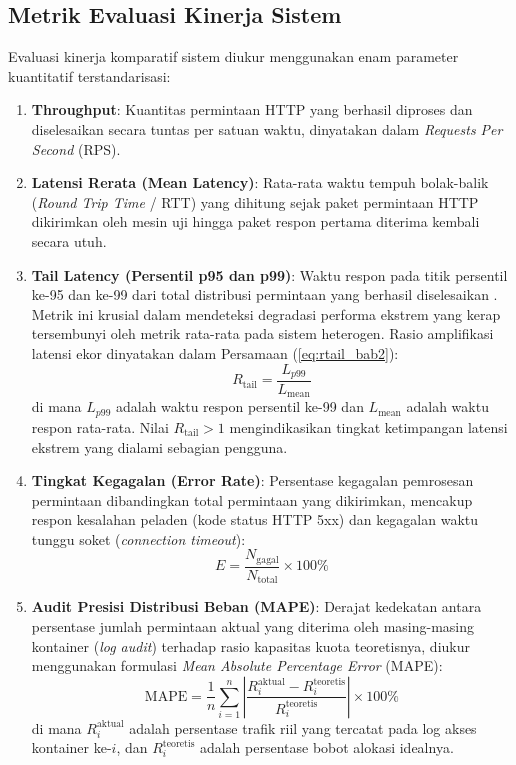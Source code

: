 \subsection{Metrik Evaluasi Kinerja Sistem}
Evaluasi kinerja komparatif sistem diukur menggunakan enam parameter kuantitatif terstandarisasi:
\begin{enumerate}
    \item \textbf{Throughput}: Kuantitas permintaan HTTP yang berhasil diproses dan diselesaikan secara tuntas per satuan waktu, dinyatakan dalam \textit{Requests Per Second} (RPS).
    \item \textbf{Latensi Rerata (Mean Latency)}: Rata-rata waktu tempuh bolak-balik (\textit{Round Trip Time} / RTT) yang dihitung sejak paket permintaan HTTP dikirimkan oleh mesin uji hingga paket respon pertama diterima kembali secara utuh.
    \item \textbf{Tail Latency (Persentil p95 dan p99)}: Waktu respon pada titik persentil ke-95 dan ke-99 dari total distribusi permintaan yang berhasil diselesaikan \citep{wodislawski2026ponytail, li2025tailbench}. Metrik ini krusial dalam mendeteksi degradasi performa ekstrem yang kerap tersembunyi oleh metrik rata-rata pada sistem heterogen. Rasio amplifikasi latensi ekor dinyatakan dalam Persamaan (\ref{eq:rtail_bab2}):
    \begin{equation}
        R_{\text{tail}} = \frac{L_{p99}}{L_{\text{mean}}}
        \label{eq:rtail_bab2}
    \end{equation}
    di mana $L_{p99}$ adalah waktu respon persentil ke-99 dan $L_{\text{mean}}$ adalah waktu respon rata-rata. Nilai $R_{\text{tail}} > 1$ mengindikasikan tingkat ketimpangan latensi ekstrem yang dialami sebagian pengguna.
    \item \textbf{Tingkat Kegagalan (Error Rate)}: Persentase kegagalan pemrosesan permintaan dibandingkan total permintaan yang dikirimkan, mencakup respon kesalahan peladen (kode status HTTP 5xx) dan kegagalan waktu tunggu soket (\textit{connection timeout}):
    \begin{equation}
        E = \frac{N_{\text{gagal}}}{N_{\text{total}}} \times 100\%
        \label{eq:error_rate_bab2}
    \end{equation}
    \item \textbf{Audit Presisi Distribusi Beban (MAPE)}: Derajat kedekatan antara persentase jumlah permintaan aktual yang diterima oleh masing-masing kontainer (\textit{log audit}) terhadap rasio kapasitas kuota teoretisnya, diukur menggunakan formulasi \textit{Mean Absolute Percentage Error} (MAPE):
    \begin{equation}
        \text{MAPE} = \frac{1}{n} \sum_{i=1}^{n} \left| \frac{R_i^{\text{aktual}} - R_i^{\text{teoretis}}}{R_i^{\text{teoretis}}} \right| \times 100\%
        \label{eq:mape_bab2}
    \end{equation}
    di mana $R_i^{\text{aktual}}$ adalah persentase trafik riil yang tercatat pada log akses kontainer ke-$i$, dan $R_i^{\text{teoretis}}$ adalah persentase bobot alokasi idealnya.
\end{enumerate}

